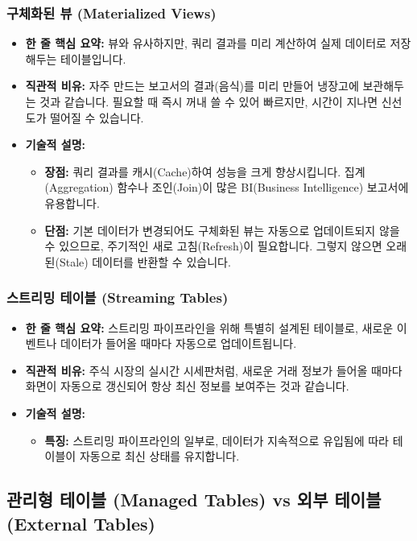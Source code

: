 \documentclass[11pt,a4paper]{article}
\theoremstyle{definition}
\begin{document}
\subsubsection{구체화된 뷰 (Materialized Views)}
\begin{itemize}
    \item \textbf{한 줄 핵심 요약:} 뷰와 유사하지만, 쿼리 결과를 미리 계산하여 실제 데이터로 저장해두는 테이블입니다.
    \item \textbf{직관적 비유:} 자주 만드는 보고서의 결과(음식)를 미리 만들어 냉장고에 보관해두는 것과 같습니다. 필요할 때 즉시 꺼내 쓸 수 있어 빠르지만, 시간이 지나면 신선도가 떨어질 수 있습니다.
    \item \textbf{기술적 설명:}
    \begin{itemize}
        \item \textbf{장점:} 쿼리 결과를 캐시(Cache)하여 성능을 크게 향상시킵니다. 집계(Aggregation) 함수나 조인(Join)이 많은 BI(Business Intelligence) 보고서에 유용합니다.
        \item \textbf{단점:} 기본 데이터가 변경되어도 구체화된 뷰는 자동으로 업데이트되지 않을 수 있으므로, 주기적인 새로 고침(Refresh)이 필요합니다. 그렇지 않으면 오래된(Stale) 데이터를 반환할 수 있습니다.
    \end{itemize}
\end{itemize}

\subsubsection{스트리밍 테이블 (Streaming Tables)}
\begin{itemize}
    \item \textbf{한 줄 핵심 요약:} 스트리밍 파이프라인을 위해 특별히 설계된 테이블로, 새로운 이벤트나 데이터가 들어올 때마다 자동으로 업데이트됩니다.
    \item \textbf{직관적 비유:} 주식 시장의 실시간 시세판처럼, 새로운 거래 정보가 들어올 때마다 화면이 자동으로 갱신되어 항상 최신 정보를 보여주는 것과 같습니다.
    \item \textbf{기술적 설명:}
    \begin{itemize}
        \item \textbf{특징:} 스트리밍 파이프라인의 일부로, 데이터가 지속적으로 유입됨에 따라 테이블이 자동으로 최신 상태를 유지합니다.
    \end{itemize}
\end{itemize}

\subsection{관리형 테이블 (Managed Tables) vs 외부 테이블 (External Tables)}
\end{document}

